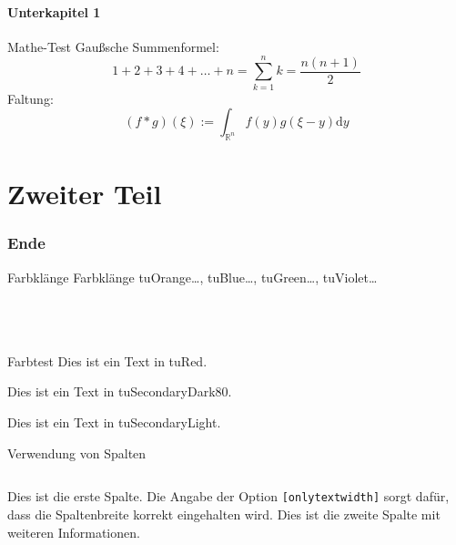 \documentclass[fleqn,11pt,aspectratio=43]{beamer}
\begin{document}
\subsection{Unterkapitel 1}


\begin{frame}{Mathe-Test}
  Gaußsche Summenformel:
  \[1 + 2 + 3 + 4 + \ldots + n = \sum_{k=1}^n k = \frac{n(n+1)}{2}\]
  Faltung:
  \[(f*g)(\xi) := \int_{\mathbb{R}^n} f(y)g(\xi-y)\mathrm{d}y\]
\end{frame}


\part{Zweiter Teil}


\begin{frame}
  \partpage
\end{frame}


\section{Ende}


\begin{frame}{Farbklänge}\small
  Farbklänge tuOrange\ldots, tuBlue\ldots, tuGreen\ldots, tuViolet\ldots\\\tiny
  ~\\
  ~\\
  ~\\
\end{frame}


\begin{frame}{Farbtest}
  \color{tuRed}
  Dies ist ein Text in tuRed.

  \color{tuSecondaryDark80}
  Dies ist ein Text in tuSecondaryDark80.

  \color{tuSecondaryLight}
  Dies ist ein Text in tuSecondaryLight.
\end{frame}


\begin{frame}{Verwendung von Spalten}
  \begin{columns}[onlytextwidth]
      Dies ist die erste Spalte.
      Die Angabe der Option \texttt{[onlytextwidth]}
      sorgt dafür, dass die Spaltenbreite korrekt eingehalten wird.
      Dies ist die zweite Spalte mit weiteren Informationen.
  \end{columns}
\end{frame}
\end{document}
